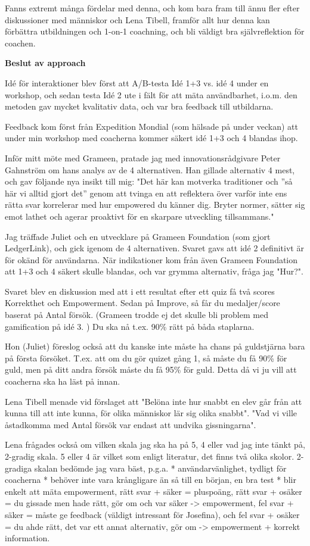 Fanns extremt många fördelar med denna, och kom bara fram till ännu fler efter diskussioner med människor och Lena Tibell, framför allt hur denna kan förbättra utbildningen och 1-on-1 coachning, och bli väldigt bra självreflektion för coachen.

\textbf{Beslut av approach}

Idé för interaktioner blev först att A/B-testa Idé 1+3 vs. idé 4 under en workshop, och sedan testa Idé 2 ute i fält för att mäta användbarhet, i.o.m. den metoden gav mycket kvalitativ data, och var bra feedback till utbildarna.

Feedback kom först från Expedition Mondial (som hälsade på under veckan) att under min workshop med coacherna kommer säkert idé 1+3 och 4 blandas ihop.

Inför mitt möte med Grameen, pratade jag med innovationsrådgivare Peter Gahnström om hans analys av de 4 alternativen. Han gillade alternativ 4 mest, och gav följande nya insikt till mig: "Det här kan motverka traditioner och ”så här vi alltid gjort det” genom att tvinga en att reflektera över varför inte ens rätta svar korrelerar med hur empowered du känner dig. Bryter normer, sätter sig emot lathet och agerar proaktivt för en skarpare utveckling tillsammans."

Jag träffade Juliet och en utvecklare på Grameen Foundation (som gjort LedgerLink), och gick igenom de 4 alternativen. Svaret gavs att idé 2 definitivt är för okänd för användarna. När indikationer kom från även Grameen Foundation att 1+3 och 4 säkert skulle blandas, och var grymma alternativ, fråga jag "Hur?".

Svaret blev en diskussion med att i ett resultat efter ett quiz få två scores Korrekthet och Empowerment. Sedan på Improve, så får du medaljer/score baserat på Antal försök. (Grameen trodde ej det skulle bli problem med gamification på idé 3. ) Du ska nå t.ex. 90\% rätt på båda staplarna.

Hon (Juliet) föreslog också att du kanske inte måste ha chans på guldstjärna bara på första försöket. T.ex. att om du gör quizet gång 1, så måste du få 90\% för guld, men på ditt andra försök måste du få 95\% för guld. Detta då vi ju vill att coacherna ska ha läst på innan.

Lena Tibell menade vid förslaget att "Belöna inte hur snabbt en elev går från att kunna till att inte kunna, för olika människor lär sig olika snabbt". "Vad vi ville åstadkomma med Antal försök var endast att undvika gissningarna".

Lena frågades också om vilken skala jag ska ha på 5, 4 eller vad jag inte tänkt på, 2-gradig skala. 5 eller 4 är vilket som enligt literatur, det finns två olika skolor. 2-gradiga skalan bedömde jag vara bäst, p.g.a.
* användarvänlighet, tydligt för coacherna
* behöver inte vara krångligare än så till en början, en bra test
* blir enkelt att mäta empowerment, rätt svar + säker = pluspoäng, rätt svar + osäker = du gissade men hade rätt, gör om och var säker -> empowerment, fel svar + säker = måste ge feedback (väldigt intressant för Josefina), och fel svar + osäker = du ahde rätt, det var ett annat alternativ, gör om -> empowerment + korrekt information.
